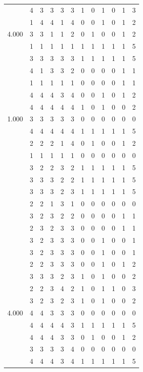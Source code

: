 \documentclass[]{msu-thesis}
\theoremstyle{definition}
\theoremstyle{definition}
\theoremstyle{definition}
\theoremstyle{remark}
\begin{document}
\begin{table}
{\begin{tabular}[t]{rrrrrrrrrrrr}
 & 4 & 3 & 3 & 3 & 3 & 1 & 0 & 1 & 0 & 1 & 3\\
 & 1 & 4 & 4 & 1 & 4 & 0 & 0 & 1 & 0 & 1 & 2\\
4.000 & 3 & 3 & 1 & 1 & 2 & 0 & 1 & 0 & 0 & 1 & 2\\
 & 1 & 1 & 1 & 1 & 1 & 1 & 1 & 1 & 1 & 1 & 5\\
 & 3 & 3 & 3 & 3 & 3 & 1 & 1 & 1 & 1 & 1 & 5\\
 & 4 & 1 & 3 & 3 & 2 & 0 & 0 & 0 & 0 & 1 & 1\\
 & 1 & 1 & 1 & 1 & 1 & 0 & 0 & 0 & 0 & 1 & 1\\
 & 4 & 4 & 4 & 3 & 4 & 0 & 0 & 1 & 0 & 1 & 2\\
 & 4 & 4 & 4 & 4 & 4 & 1 & 0 & 1 & 0 & 0 & 2\\
1.000 & 3 & 3 & 3 & 3 & 3 & 0 & 0 & 0 & 0 & 0 & 0\\
 & 4 & 4 & 4 & 4 & 4 & 1 & 1 & 1 & 1 & 1 & 5\\
 & 2 & 2 & 2 & 1 & 4 & 0 & 1 & 0 & 0 & 1 & 2\\
 & 1 & 1 & 1 & 1 & 1 & 0 & 0 & 0 & 0 & 0 & 0\\
 & 3 & 2 & 2 & 3 & 2 & 1 & 1 & 1 & 1 & 1 & 5\\
 & 3 & 3 & 3 & 2 & 2 & 1 & 1 & 1 & 1 & 1 & 5\\
 & 3 & 3 & 3 & 2 & 3 & 1 & 1 & 1 & 1 & 1 & 5\\
 & 2 & 2 & 1 & 3 & 1 & 0 & 0 & 0 & 0 & 0 & 0\\
 & 3 & 2 & 3 & 2 & 2 & 0 & 0 & 0 & 0 & 1 & 1\\
 & 2 & 3 & 2 & 3 & 3 & 0 & 0 & 0 & 0 & 1 & 1\\
 & 3 & 2 & 3 & 3 & 3 & 0 & 0 & 1 & 0 & 0 & 1\\
 & 3 & 2 & 3 & 3 & 3 & 0 & 0 & 1 & 0 & 0 & 1\\
 & 2 & 2 & 3 & 3 & 3 & 0 & 0 & 1 & 0 & 1 & 2\\
 & 3 & 3 & 3 & 2 & 3 & 1 & 0 & 1 & 0 & 0 & 2\\
 & 2 & 2 & 3 & 4 & 2 & 1 & 0 & 1 & 1 & 0 & 3\\
 & 3 & 2 & 3 & 2 & 3 & 1 & 0 & 1 & 0 & 0 & 2\\
4.000 & 4 & 4 & 3 & 3 & 3 & 0 & 0 & 0 & 0 & 0 & 0\\
 & 4 & 4 & 4 & 4 & 3 & 1 & 1 & 1 & 1 & 1 & 5\\
 & 4 & 4 & 4 & 3 & 3 & 0 & 1 & 0 & 0 & 1 & 2\\
 & 3 & 3 & 3 & 3 & 4 & 0 & 0 & 0 & 0 & 0 & 0\\
 & 4 & 4 & 4 & 3 & 4 & 1 & 1 & 1 & 1 & 1 & 5\\

\end{tabular}}
\end{table}
\end{document}
